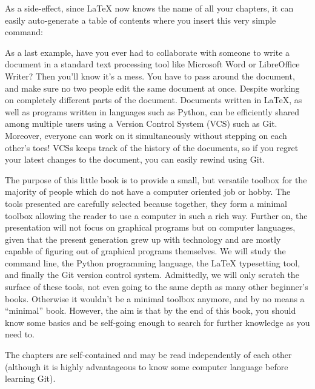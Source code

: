 As a side-effect, since \LaTeX{} now knows the name of all your chapters, it can easily auto-generate a table of contents where you insert this very simple command:

\latexone{\tableofcontents}

As a last example, have you ever had to collaborate with someone to write a document in a standard text processing tool like Microsoft Word or LibreOffice Writer? Then you’ll know it’s a mess. You have to pass around the document, and make sure no two people edit the same document at once. Despite working on completely different parts of the document. Documents written in \LaTeX{}, as well as programs written in languages such as Python, can be efficiently shared among multiple users using a Version Control System (VCS) such as Git. Moreover, everyone can work on it simultaneously without stepping on each other's toes! VCSs keeps track of the history of the documents, so if you regret your latest changes to the document, you can easily rewind using Git.

The purpose of this little book is to provide a small, but versatile toolbox for the majority of people which do not have a computer oriented job or hobby. The tools presented are carefully selected because together, they form a minimal toolbox allowing the reader to use a computer in such a rich way. Further on, the presentation will not focus on graphical programs but on computer languages, given that the present generation grew up with technology and are mostly capable of figuring out of graphical programs themselves. We will study the command line, the Python programming language, the \LaTeX{} typesetting tool, and finally the Git version control system. Admittedly, we will only scratch the surface of these tools, not even going to the same depth as many other beginner's books. Otherwise it wouldn't be a minimal toolbox anymore, and by no means a ``minimal'' book. However, the aim is that by the end of this book, you should know some basics and be self-going enough to search for further knowledge as you need to.

The chapters are self-contained and may be read independently of each other (although it is highly advantageous to know some computer language before learning Git).